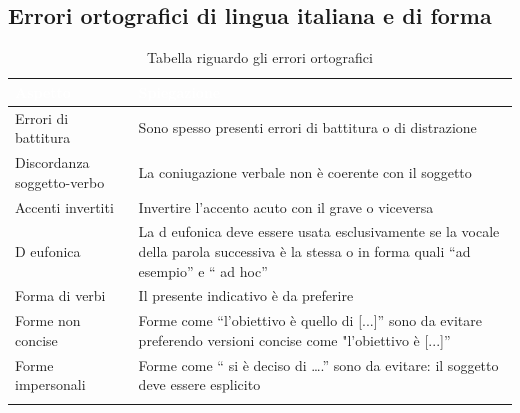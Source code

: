 \subsection{Errori ortografici di lingua italiana e di forma}
{
    \setlength{\freewidth}{\dimexpr\textwidth-10\tabcolsep}
    \renewcommand{\arraystretch}{1.5}
    \centering
    \setlength{\aboverulesep}{0pt}
    \setlength{\belowrulesep}{0pt}
    \begin{longtable}{C{.5\freewidth} C{.5\freewidth}}
       \toprule
    \textcolor{white}{\textbf{Aspetto}}&
    \textcolor{white}{\textbf{Spiegazione}}\\
    \toprule
    \endhead

    Errori di battitura & Sono spesso presenti errori di battitura o di distrazione \\
    Discordanza soggetto-verbo & La coniugazione verbale non è coerente con il soggetto \\
    Accenti invertiti & Invertire l'accento acuto con il grave o viceversa \\
    D eufonica & La d eufonica deve essere usata esclusivamente se la vocale della parola successiva è la stessa o in forma quali “ad esempio” e “ ad hoc” \\
    Forma di verbi & Il presente indicativo è da preferire \\
    Forme non concise & Forme come “l'obiettivo è quello di [...]” sono da evitare preferendo versioni concise come "l'obiettivo è [...]”\\
    Forme impersonali & Forme come “ si è deciso di ….” sono da evitare: il soggetto deve essere esplicito \\  
    
    \bottomrule
    \caption{Tabella riguardo gli errori ortografici}
\end{longtable}
}

\newpage

